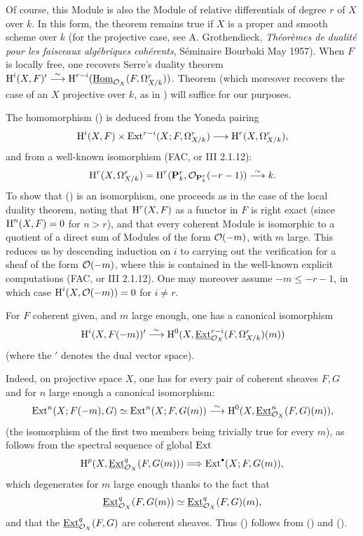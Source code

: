 \begin{remarkstar}
Of course, this Module is also the Module of relative differentials of degree $r$ of $X$ over $k$. In this form, the theorem remains true if $X$ is a proper and smooth scheme over $k$ (for the projective case, see A. Grothendieck, \og \emph{Th\'eor\`emes de dualit\'e pour les faisceaux alg\'ebriques coh\'erents}\fg, S\'eminaire Bourbaki May 1957). When $F$ is locally free, one recovers Serre's duality theorem $\operatorname{H}^i(X, F)' \overset{\sim}{\longrightarrow} \operatorname{H}^{r-i}(\operatorname{\underline{Hom}}_{\mathcal{O}_X}(F, \Omega_{X/k}^r))$. Theorem  (which moreover recovers the case of an $X$ projective over $k$, as in {\loccit}) will suffice for our purposes.
\end{remarkstar} The homomorphism () is deduced from the Yoneda pairing
\steco
\begin{equation} \label{eq:XII.3} {}\H^i(X, F) \times \Ext^{r-i}(X;F, \omx^r) \to \H^r(X, \omx^r),
\end{equation}
and from a well-known isomorphism (\cf FAC, or \EGA III 2.1.12):
\steco
\begin{equation} \label{eq:XII.4} {}\operatorname{H}^r(X, \Omega_{X/k}^r) = \operatorname{H}^r({\mathbf P}_k^r, {\mathcal O}_{{\mathbf P}_k^r}(-r-1)) \overset{\sim}{\longrightarrow} k.
\end{equation}
To show that () is an isomorphism, one proceeds as in the case of the local duality theorem, noting that $\operatorname{H}^r(X, F)$ as a functor in $F$ is right exact (since $\operatorname{H}^n(X, F)=0$ for $n>r$), and that every coherent Module is isomorphic to a quotient of a direct sum of Modules of the form ${\mathcal O}(-m)$, with $m$ large. This reduces us by descending induction on $i$ to carrying out the verification for a sheaf of the form ${\mathcal O}(-m)$, where this is contained in the well-known explicit computations (FAC, or \EGA III 2.1.12). One may moreover assume $-m \leq -r-1$, in which case $\operatorname{H}^i(X, {\mathcal O}(-m))=0$ for $i\neq r$.

\begin{corollary} \label{XII.1.2} For $F$ coherent given, and $m$ large enough, one has a canonical isomorphism
\steco
\begin{equation} \label{eq:XII.5} {}\operatorname{H}^i(X, F(-m))'\overset{\sim}{\longrightarrow}\operatorname{H}^0(X, \operatorname{\underline{Ext}}_{\mathcal{O}_X}^{r-i}(F, \Omega_{X/k}^r)(m))
\end{equation}
(where the $'$ denotes the dual vector space).
\end{corollary}
Indeed, on projective space $X$, one has for every pair of coherent sheaves $F, G$ and for $n$ large enough a canonical isomorphism:
\steco
\begin{equation} \label{eq:XII.6} {}\operatorname{Ext}^n(X;F(-m), G)\simeq \operatorname{Ext}^n(X;F, G(m)) \overset{\sim}{\longrightarrow} \operatorname{H}^0(X, \operatorname{\underline{Ext}}_{\mathcal{O}_X}^{n}(F, G)(m)),
\end{equation}
(the isomorphism of the first two members being trivially true for every $m$), as follows from the spectral sequence of global $\operatorname{Ext}$
\[
\H^p(X, \SheafExt^q_{\OX}(F, G(m))) \To \Ext^{\boule}(X;F, G(m)),
\]
which degenerates for $m$ large enough thanks to the fact that
\[
\operatorname{\underline{Ext}}^q_{\mathcal{O}_X}(F, G(m)) \simeq \operatorname{\underline{Ext}}^q_{\mathcal{O}_X}(F, G)(m),
\]
and that the $\operatorname{\underline{Ext}}^q_{\mathcal{O}_X}(F, G)$ are coherent sheaves. Thus () follows from () and ().

